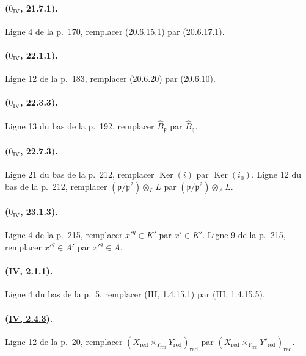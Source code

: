 \paragraph{($0_{\mathrm{IV}}$, 21.7.1).}
Ligne 4 de la p.~170, remplacer (20.6.15.1) par (20.6.17.1).

\paragraph{($0_{\mathrm{IV}}$, 22.1.1).}
Ligne 12 de la p.~183, remplacer (20.6.20) par (20.6.10).

\paragraph{($0_{\mathrm{IV}}$, 22.3.3).}
Ligne 13 du bas de la p.~192, remplacer $\widehat B_{\mathfrak p}$ par
$\widehat B_{\mathfrak q}$.

\paragraph{($0_{\mathrm{IV}}$, 22.7.3).}
Ligne 21 du bas de la p.~212, remplacer $\operatorname{Ker}(i)$ par
$\operatorname{Ker}(i_0)$. Ligne 12 du bas de la p.~212, remplacer
$(\mathfrak p/\mathfrak p^2)\otimes_L L$ par
$(\mathfrak p/\mathfrak p^2)\otimes_A L$.

\paragraph{($0_{\mathrm{IV}}$, 23.1.3).}
Ligne 4 de la p.~215, remplacer $x'^q\in K'$ par $x'\in K'$. Ligne 9
de la p.~215, remplacer $x'^q\in A'$ par $x'^q\in A$.

\paragraph{({\texorpdfstring{\protect\hyperlink{ega4.c04.statement.2-1-1}{IV, 2.1.1}}{IV, 2.1.1}}).}
Ligne 4 du bas de la p.~5, remplacer (III, 1.4.15.1) par
(III, 1.4.15.5).

\paragraph{({\texorpdfstring{\protect\hyperlink{ega4.c04.prop.2-4-3}{IV, 2.4.3}}{IV, 2.4.3}}).}
Ligne 12 de la p.~20, remplacer
$(X_{\mathrm{red}}\times_{Y_{\mathrm{red}}}Y_{\mathrm{red}})_{\mathrm{red}}$
par
$(X_{\mathrm{red}}\times_{Y_{\mathrm{red}}}Y'_{\mathrm{red}})_{\mathrm{red}}$.

